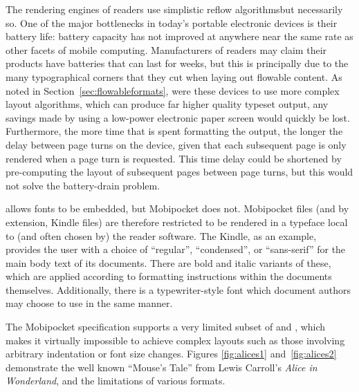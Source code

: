 The rendering engines of \ebook{} readers use simplistic reflow algorithms\ed but necessarily so. One of the major bottlenecks in today's portable electronic devices is their battery life: battery capacity has not improved at anywhere near the same rate as other facets of mobile computing. Manufacturers of \ebook{} readers may claim their products have batteries that can last for weeks, but this is principally due to the many typographical corners that they cut when laying out flowable content. As noted in Section~\ref{sec:flowableformats}, were these devices to use more complex layout algorithms, which can produce far higher quality typeset output, any savings made by using a low-power electronic paper screen would quickly be lost. Furthermore, the more time that is spent formatting the output, the longer the delay between page turns on the device, given that each subsequent page is only rendered when a page turn is requested. This time delay could be shortened by pre-computing the layout of subsequent pages between page turns, but this would not solve the battery-drain problem.


\epub{} allows fonts to be embedded, but Mobipocket does not. Mobipocket files (and by extension, Kindle files) are therefore restricted to be rendered in a typeface local to (and often chosen by) the reader software. The Kindle, as an example, provides the user with a choice of ``regular'', ``condensed'', or ``sans-serif'' for the main body text of its documents. There are bold and italic variants of these, which are applied according to formatting instructions within the documents themselves. Additionally, there is a typewriter-style font which document authors may choose to use in the same manner.

The Mobipocket specification supports a very limited subset of \html{} and \css{}, which makes it virtually impossible to achieve complex layouts such as those involving arbitrary indentation or font size changes. Figures \ref{fig:alices1} and~\ref{fig:alices2} demonstrate the well known ``Mouse's Tale'' from Lewis Carroll's \emph{Alice in Wonderland}, and the limitations of various formats.


